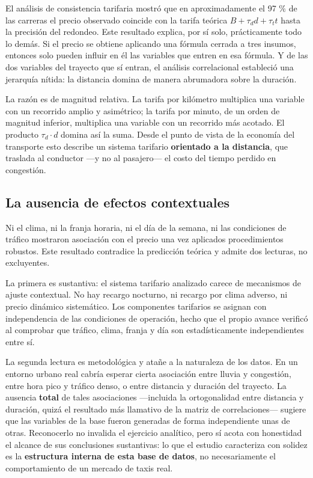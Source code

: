 \documentclass[
]{book}
\begin{document}
El análisis de consistencia tarifaria mostró que en aproximadamente el 97 \% de las carreras el
precio observado coincide con la tarifa teórica \(B + \tau_d d + \tau_t t\) hasta la precisión
del redondeo. Este resultado explica, por sí solo, prácticamente todo lo demás. Si el precio
se obtiene aplicando una fórmula cerrada a tres insumos, entonces solo pueden influir en él
las variables que entren en esa fórmula. Y de las dos variables del trayecto que sí entran, el
análisis correlacional estableció una jerarquía nítida: la distancia domina de manera
abrumadora sobre la duración.

La razón es de magnitud relativa. La tarifa por kilómetro multiplica una variable con un
recorrido amplio y asimétrico; la tarifa por minuto, de un orden de magnitud inferior,
multiplica una variable con un recorrido más acotado. El producto \(\tau_d \cdot d\) domina así
la suma. Desde el punto de vista de la economía del transporte esto describe un sistema
tarifario \textbf{orientado a la distancia}, que traslada al conductor ---y no al pasajero--- el costo
del tiempo perdido en congestión.

\subsection{La ausencia de efectos contextuales}\label{la-ausencia-de-efectos-contextuales}

Ni el clima, ni la franja horaria, ni el día de la semana, ni las condiciones de tráfico
mostraron asociación con el precio una vez aplicados procedimientos robustos. Este resultado
contradice la predicción teórica y admite dos lecturas, no excluyentes.

La primera es sustantiva: el sistema tarifario analizado carece de mecanismos de ajuste
contextual. No hay recargo nocturno, ni recargo por clima adverso, ni precio dinámico
sistemático. Los componentes tarifarios se asignan con independencia de las condiciones de
operación, hecho que el propio avance verificó al comprobar que tráfico, clima, franja y día
son estadísticamente independientes entre sí.

La segunda lectura es metodológica y atañe a la naturaleza de los datos. En un entorno urbano
real cabría esperar cierta asociación entre lluvia y congestión, entre hora pico y tráfico
denso, o entre distancia y duración del trayecto. La ausencia \textbf{total} de tales asociaciones
---incluida la ortogonalidad entre distancia y duración, quizá el resultado más llamativo de la
matriz de correlaciones--- sugiere que las variables de la base fueron generadas de forma
independiente unas de otras. Reconocerlo no invalida el ejercicio analítico, pero sí acota
con honestidad el alcance de sus conclusiones sustantivas: lo que el estudio caracteriza con
solidez es la \textbf{estructura interna de esta base de datos}, no necesariamente el
comportamiento de un mercado de taxis real.
\end{document}
